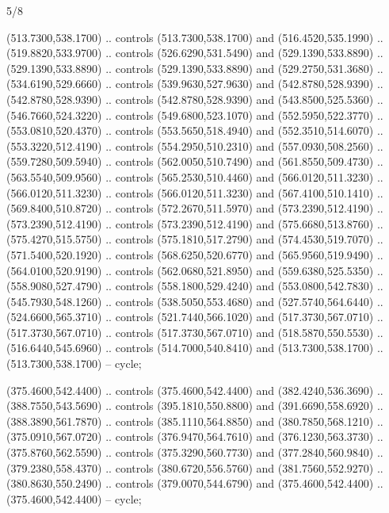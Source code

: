 \begin{flagdescription}{5/8}
\begin{scope}[shift={(m)}]
\begin{scope}[scale=\flagwidth/220,y=0.1mm, x=0.1mm, yscale=-1,shift={(-596,-360)}]
\begin{scope}[cm={{-1.0,0.0,0.0,1.0,(1193.9797,0.0)}}]
\begin{scope}[draw=black,line join=round,line cap=round,line width=0.381\lw]
\begin{scope}[fill=white,line width=1.143\lw]
 (513.7300,538.1700) .. controls (513.7300,538.1700) and
  (516.4520,535.1990) .. (519.8820,533.9700) .. controls (526.6290,531.5490) and
  (529.1390,533.8890) .. (529.1390,533.8890) .. controls (529.1390,533.8890) and
  (529.2750,531.3680) .. (534.6190,529.6660) .. controls (539.9630,527.9630) and
  (542.8780,528.9390) .. (542.8780,528.9390) .. controls (542.8780,528.9390) and
  (543.8500,525.5360) .. (546.7660,524.3220) .. controls (549.6800,523.1070) and
  (552.5950,522.3770) .. (553.0810,520.4370) .. controls (553.5650,518.4940) and
  (552.3510,514.6070) .. (553.3220,512.4190) .. controls (554.2950,510.2310) and
  (557.0930,508.2560) .. (559.7280,509.5940) .. controls (562.0050,510.7490) and
  (561.8550,509.4730) .. (563.5540,509.9560) .. controls (565.2530,510.4460) and
  (566.0120,511.3230) .. (566.0120,511.3230) .. controls (566.0120,511.3230) and
  (567.4100,510.1410) .. (569.8400,510.8720) .. controls (572.2670,511.5970) and
  (573.2390,512.4190) .. (573.2390,512.4190) .. controls (573.2390,512.4190) and
  (575.6680,513.8760) .. (575.4270,515.5750) .. controls (575.1810,517.2790) and
  (574.4530,519.7070) .. (571.5400,520.1920) .. controls (568.6250,520.6770) and
  (565.9560,519.9490) .. (564.0100,520.9190) .. controls (562.0680,521.8950) and
  (559.6380,525.5350) .. (558.9080,527.4790) .. controls (558.1800,529.4240) and
  (553.0800,542.7830) .. (545.7930,548.1260) .. controls (538.5050,553.4680) and
  (527.5740,564.6440) .. (524.6600,565.3710) .. controls (521.7440,566.1020) and
  (517.3730,567.0710) .. (517.3730,567.0710) .. controls (517.3730,567.0710) and
  (518.5870,550.5530) .. (516.6440,545.6960) .. controls (514.7000,540.8410) and
  (513.7300,538.1700) .. (513.7300,538.1700) -- cycle;

\end{scope}
\begin{scope}[line width=0.534\lw,fill=green]
 (375.4600,542.4400) .. controls (375.4600,542.4400) and
  (382.4240,536.3690) .. (388.7550,543.5690) .. controls (395.1810,550.8800) and
  (391.6690,558.6920) .. (388.3890,561.7870) .. controls (385.1110,564.8850) and
  (380.7850,568.1210) .. (375.0910,567.0720) .. controls (376.9470,564.7610) and
  (376.1230,563.3730) .. (375.8760,562.5590) .. controls (375.3290,560.7730) and
  (377.2840,560.9840) .. (379.2380,558.4370) .. controls (380.6720,556.5760) and
  (381.7560,552.9270) .. (380.8630,550.2490) .. controls (379.0070,544.6790) and
  (375.4600,542.4400) .. (375.4600,542.4400) -- cycle;


\end{scope}
\end{scope}
\end{scope}
\end{scope}
\end{scope}
\end{flagdescription}
